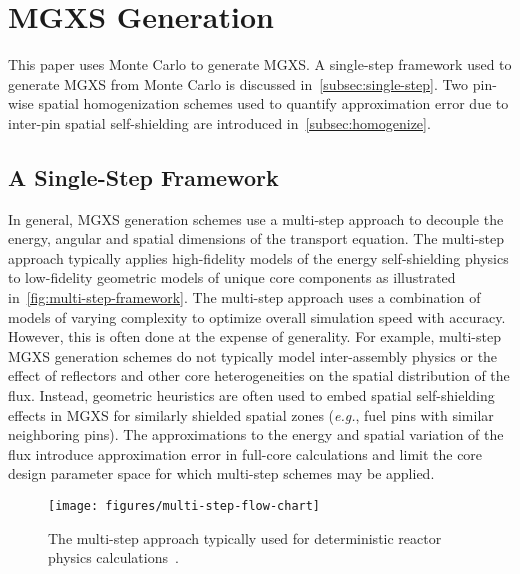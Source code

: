 \section{MGXS Generation}
\label{sec:mgxs-generation}

This paper uses Monte Carlo to generate MGXS. A single-step framework used to generate MGXS from Monte Carlo is discussed in~\autoref{subsec:single-step}. Two pin-wise spatial homogenization schemes used to quantify approximation error due to inter-pin spatial self-shielding are introduced in~\autoref{subsec:homogenize}.


\subsection{A Single-Step Framework}
\label{subsec:single-step}

In general, MGXS generation schemes use a multi-step approach to decouple the energy, angular and spatial dimensions of the transport equation. The multi-step approach typically applies high-fidelity models of the energy self-shielding physics to low-fidelity geometric models of unique core components as illustrated in~\autoref{fig:multi-step-framework}. The multi-step approach uses a combination of models of varying complexity to optimize overall simulation speed with accuracy. However, this is often done at the expense of generality. For example, multi-step MGXS generation schemes do not typically model inter-assembly physics or the effect of reflectors and other core heterogeneities on the spatial distribution of the flux. Instead, geometric heuristics are often used to embed spatial self-shielding effects in MGXS for similarly shielded spatial zones (\textit{e.g.}, fuel pins with similar neighboring pins). The approximations to the energy and spatial variation of the flux introduce approximation error in full-core calculations and limit the core design parameter space for which multi-step schemes may be applied. 

\begin{figure}[h!]
\centering
\texttt{[image: figures/multi-step-flow-chart]}
\caption{The multi-step approach typically used for deterministic reactor physics calculations~\citep{gibson2016thesis}.}
\label{fig:multi-step-framework}
\end{figure}

